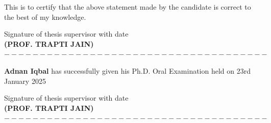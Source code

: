 This is to certify that the above statement made by the candidate is correct to the best of my knowledge.


\vspace*{1.0cm}


\begin{flushright}
\footnotesize Signature of thesis supervisor with date\\
\normalsize \textbf{(PROF. TRAPTI JAIN)}
$-------------------------------------$
\end{flushright}




\begin{small}\vspace{-1ex} \textbf{Adnan Iqbal} has successfully given his Ph.D. Oral Examination held on 23rd January 2025
\end{small}

\vspace*{1.0cm}

\begin{flushright}
\footnotesize Signature of thesis supervisor with date\\
\normalsize \textbf{(PROF. TRAPTI JAIN)}
$-------------------------------------$
\end{flushright}
